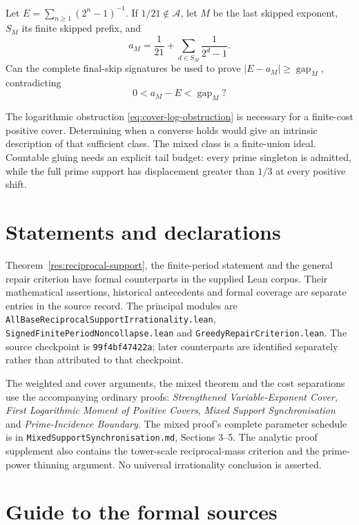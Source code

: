 \documentclass[11pt]{article}
\renewcommand{\commitshort}{99f4bf47422a}
\newcommand{\Ach}{\mathcal A}
\begin{document}
\begin{problem}\label{prob:fatal-interval}
Let $E=\sum_{n\ge1}(2^n-1)^{-1}$.  If $1/21\notin\Ach$, let $M$ be the last
skipped exponent, $S_M$ its finite skipped prefix, and
\[
 a_M=\frac1{21}+\sum_{d\in S_M}\frac1{2^d-1}.
\]
Can the complete final-skip signatures be used to prove
$|E-a_M|\ge\operatorname{gap}_M$, contradicting
\[
 0<a_M-E<\operatorname{gap}_M?
\]
\end{problem}


The logarithmic obstruction \eqref{eq:cover-log-obstruction} is necessary
for a finite-cost positive cover.  Determining when a converse holds would
give an intrinsic description of that sufficient class.  The mixed
class is a finite-union ideal.  Countable gluing needs an explicit tail
budget: every prime singleton is admitted, while the full prime support
has displacement greater than $1/3$ at every positive shift.

\section*{Statements and declarations}
Theorem~\ref{res:reciprocal-support}, the finite-period statement and the
general repair criterion have formal counterparts in the supplied Lean
corpus.  Their mathematical assertions, historical antecedents and formal
coverage are separate entries in the source record.  The principal modules
are \texttt{AllBaseReciprocalSupportIrrationality.lean},
\texttt{SignedFinitePeriodNoncollapse.lean} and
\texttt{GreedyRepairCriterion.lean}.
The source checkpoint is \texttt{\commitshort}; later counterparts are
identified separately rather than attributed to that checkpoint.

The weighted and cover arguments, the mixed theorem and the cost
separations use the accompanying ordinary proofs:
\emph{Strengthened Variable-Exponent Cover},
\emph{First Logarithmic Moment of Positive Covers},
\emph{Mixed Support Synchronisation} and \emph{Prime-Incidence Boundary}.
The mixed proof's complete parameter schedule is in
\texttt{MixedSupportSynchronisation.md}, Sections 3--5.
The analytic proof supplement also contains the tower-scale reciprocal-mass
criterion and the prime-power thinning argument.
No universal irrationality conclusion is asserted.

\appendix
\section{Guide to the formal sources}\label{app:sources}
\end{document}
